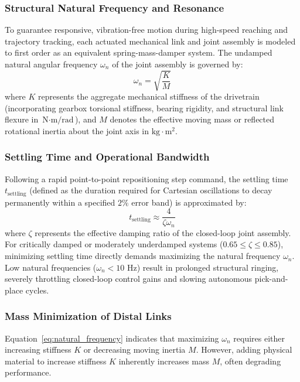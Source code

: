 \subsubsection{Structural Natural Frequency and Resonance}
To guarantee responsive, vibration-free motion during high-speed reaching and trajectory tracking, each actuated mechanical link and joint assembly is modeled to first order as an equivalent spring-mass-damper system. The undamped natural angular frequency $\omega_n$ of the joint assembly is governed by:
\begin{equation}
\omega_n = \sqrt{\frac{K}{M}}
\label{eq:natural_frequency}
\end{equation}
where $K$ represents the aggregate mechanical stiffness of the drivetrain (incorporating gearbox torsional stiffness, bearing rigidity, and structural link flexure in $\text{N}\cdot\text{m/rad}$), and $M$ denotes the effective moving mass or reflected rotational inertia about the joint axis in $\text{kg}\cdot\text{m}^2$.

\subsubsection{Settling Time and Operational Bandwidth}
Following a rapid point-to-point repositioning step command, the settling time $t_{\text{settling}}$ (defined as the duration required for Cartesian oscillations to decay permanently within a specified $2\%$ error band) is approximated by:
\begin{equation}
t_{\text{settling}} \approx \frac{4}{\zeta \omega_n}
\label{eq:settling_time}
\end{equation}
where $\zeta$ represents the effective damping ratio of the closed-loop joint assembly. For critically damped or moderately underdamped systems ($0.65 \le \zeta \le 0.85$), minimizing settling time directly demands maximizing the natural frequency $\omega_n$. Low natural frequencies ($\omega_n < 10\text{ Hz}$) result in prolonged structural ringing, severely throttling closed-loop control gains and slowing autonomous pick-and-place cycles.

\subsubsection{Mass Minimization of Distal Links}
Equation~\eqref{eq:natural_frequency} indicates that maximizing $\omega_n$ requires either increasing stiffness $K$ or decreasing moving inertia $M$. However, adding physical material to increase stiffness $K$ inherently increases mass $M$, often degrading performance.

